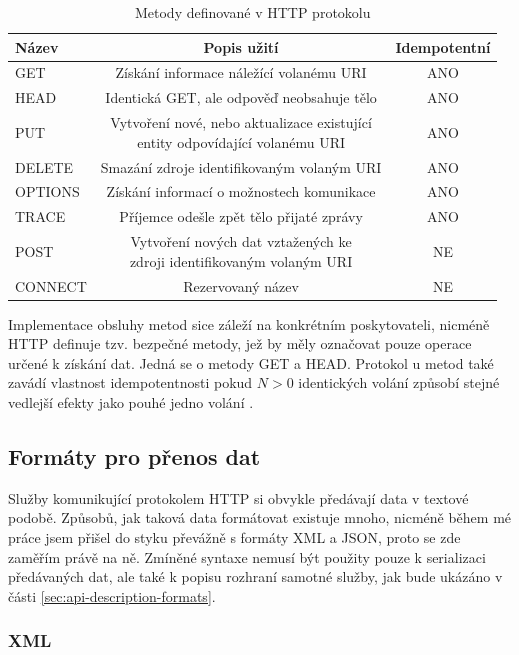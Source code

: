 \documentclass[czech,DP]{thesiskiv}
\begin{document}
\begin{table}[h]
	\centering
	\begin{tabular}{|l|c|c|}
		\hline
		Název & Popis užití & Idempotentní \\
		\hline
		\hline
		GET & Získání informace náležící volanému URI & ANO \\
		\hline
		HEAD & Identická GET, ale odpověď neobsahuje tělo & ANO \\
		\hline
		PUT & \makecell{Vytvoření nové, nebo aktualizace existující \\ entity odpovídající volanému URI }  & ANO \\
		\hline
		DELETE & Smazání zdroje identifikovaným volaným URI & ANO \\
		\hline
		OPTIONS & Získání informací o možnostech komunikace  & ANO \\
		\hline
		TRACE & Příjemce odešle zpět tělo přijaté zprávy & ANO \\
		\hline
		POST & \makecell{Vytvoření nových dat vztažených ke \\ zdroji identifikovaným volaným URI} & NE \\
		\hline
		CONNECT & Rezervovaný název & NE \\
		\hline		
	\end{tabular}
	\caption{Metody definované v HTTP protokolu}
	\label{tab:http-methods}
\end{table}

Implementace obsluhy metod sice záleží na konkrétním poskytovateli, nicméně HTTP definuje tzv. bezpečné metody, jež by měly označovat pouze operace určené k získání dat. Jedná se o metody GET a HEAD. Protokol u metod také zavádí vlastnost idempotentnosti pokud $N>0$ identických volání způsobí stejné vedlejší efekty jako pouhé jedno volání \cite{httpRfc}.


\subsection{Formáty pro přenos dat}

Služby komunikující protokolem HTTP si obvykle předávají data v textové podobě. Způsobů, jak taková data formátovat existuje mnoho, nicméně během mé práce jsem přišel do styku převážně s formáty XML a JSON, proto se zde zaměřím právě na ně. Zmíněné syntaxe nemusí být použity pouze k serializaci předávaných dat, ale také k popisu rozhraní samotné služby, jak bude ukázáno v části \ref{sec:api-description-formats}.

\subsubsection{XML}
\end{document}
